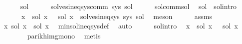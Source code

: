 \begin{isabellebody}
\ \ \ \ \isamarkupfalse%
\ sol{\isacharprime}{\kern0pt}\isanewline
\ \ \ \ \isamarkupfalse%
\ {\isachardoublequoteopen}solves{\isacharunderscore}{\kern0pt}ineq{\isacharunderscore}{\kern0pt}sys{\isacharunderscore}{\kern0pt}comm\ sys\ sol{\isacharprime}{\kern0pt}{\isachardoublequoteclose}\isanewline
\ \ \ \ \isamarkupfalse%
\ sol{\isacharunderscore}{\kern0pt}comm{\isacharunderscore}{\kern0pt}sol\ \isamarkupfalse%
\ sol{\isacharprime}{\kern0pt}{\isacharprime}{\kern0pt}\ \ sol{\isacharprime}{\kern0pt}{\isacharprime}{\kern0pt}{\isacharunderscore}{\kern0pt}intro{\isacharcolon}{\kern0pt}\isanewline
\ \ \ \ \ \ {\isachardoublequoteopen}{\isacharparenleft}{\kern0pt}{\isasymforall}x{\isachardot}{\kern0pt}\ {\isasymPsi}\ {\isacharparenleft}{\kern0pt}sol{\isacharprime}{\kern0pt}\ x{\isacharparenright}{\kern0pt}\ {\isacharequal}{\kern0pt}\ {\isasymPsi}\ {\isacharparenleft}{\kern0pt}sol{\isacharprime}{\kern0pt}{\isacharprime}{\kern0pt}\ x{\isacharparenright}{\kern0pt}{\isacharparenright}{\kern0pt}\ {\isasymand}\ solves{\isacharunderscore}{\kern0pt}ineq{\isacharunderscore}{\kern0pt}sys\ sys\ sol{\isacharprime}{\kern0pt}{\isacharprime}{\kern0pt}{\isachardoublequoteclose}\ \isamarkupfalse%
\ meson\isanewline
\ \ \ \ \isamarkupfalse%
\ assms\ \isamarkupfalse%
\ {\isachardoublequoteopen}{\isasymforall}x{\isachardot}{\kern0pt}\ sol\ x\ {\isasymsubseteq}\ sol{\isacharprime}{\kern0pt}{\isacharprime}{\kern0pt}\ x{\isachardoublequoteclose}\ \isamarkupfalse%
\ min{\isacharunderscore}{\kern0pt}sol{\isacharunderscore}{\kern0pt}ineq{\isacharunderscore}{\kern0pt}sys{\isacharunderscore}{\kern0pt}def\ \isamarkupfalse%
\ auto\isanewline
\ \ \ \ \isamarkupfalse%
\ sol{\isacharprime}{\kern0pt}{\isacharprime}{\kern0pt}{\isacharunderscore}{\kern0pt}intro\ \isamarkupfalse%
\ {\isachardoublequoteopen}{\isasymforall}x{\isachardot}{\kern0pt}\ {\isasymPsi}\ {\isacharparenleft}{\kern0pt}sol\ x{\isacharparenright}{\kern0pt}\ {\isasymsubseteq}\ {\isasymPsi}\ {\isacharparenleft}{\kern0pt}sol{\isacharprime}{\kern0pt}\ x{\isacharparenright}{\kern0pt}{\isachardoublequoteclose}\isanewline
\ \ \ \ \ \ \isamarkupfalse%
\ parikh{\isacharunderscore}{\kern0pt}img{\isacharunderscore}{\kern0pt}mono\ \isamarkupfalse%
\ metis\isanewline
\ \ \isamarkupfalse%
\isanewline
{}\isamarkupfalse%
%

\end{isabellebody}
